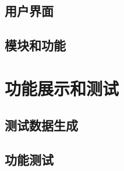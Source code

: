 \documentclass[hyperref,a4paper,UTF8]{ctexart}
\begin{document}
\subsection{用户界面}

\subsection{模块和功能}


\section{功能展示和测试\label{sec:功能展示和测试}}

\subsection{测试数据生成}


\subsection{功能测试}
\end{document}
